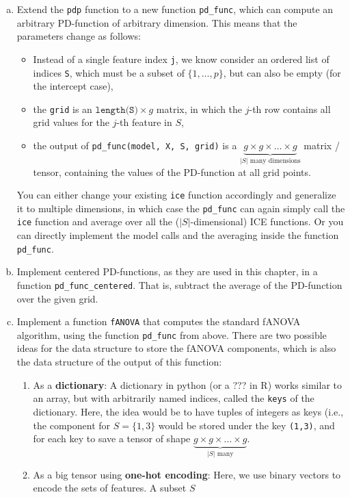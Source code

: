 {\begin{enumerate}[a)]
    \item
    Extend the \texttt{pdp} function to a new function \texttt{pd\_func}, which can compute an arbitrary PD-function of arbitrary dimension.
    This means that the parameters change as follows:
    \begin{itemize}
        \item Instead of a single feature index \texttt{j}, we know consider an ordered list of indices \texttt{S}, which must be a subset of $\{1, \dots, p\}$, but can also be empty (for the intercept case),
        \item the \texttt{grid} is an $\texttt{length(S)} \times g$ matrix, in which the $j$-th row contains all grid values for the $j$-th feature in $S$,
        \item the output of \texttt{pd\_func(model, X, S, grid)} is a $\underbrace{g \times g \times \dots \times g}_{|S| \text{ many dimensions}}$ matrix / tensor, containing the values of the PD-function at all grid points.
    \end{itemize}
    You can either change your existing \texttt{ice} function accordingly and generalize it to multiple dimensions, in which case the \texttt{pd\_func} can again simply call the \texttt{ice} function and average over all the ($|S|$-dimensional) ICE functions.
    Or you can directly implement the model calls and the averaging inside the function \texttt{pd\_func}.

    \item 
    Implement centered PD-functions, as they are used in this chapter, in a function \texttt{pd\_func\_centered}.
    That is, subtract the average of the PD-function over the given grid.

    \item
    Implement a function \texttt{fANOVA} that computes the standard fANOVA algorithm, using the function \texttt{pd\_func} from above.
    There are two possible ideas for the data structure to store the fANOVA components, which is also the data structure of the output of this function:
    \begin{enumerate}
        \item As a \textbf{dictionary}:
        A dictionary in python (or a ??? in R) works similar to an array, but with arbitrarily named indices, called the \texttt{keys} of the dictionary.
        Here, the idea would be to have tuples of integers as keys (i.e., the component for $S = \{1,3\}$ would be stored under the key \texttt{(1,3)}, and for each key to save a tensor of shape $\underbrace{g \times g \times \dots \times g}_{|S| \text{ many}}$.
        \item As a big tensor using \textbf{one-hot encoding}:
        Here, we use binary vectors to encode the sets of features.
        A subset $S$
    \end{enumerate}


\end{enumerate}}

